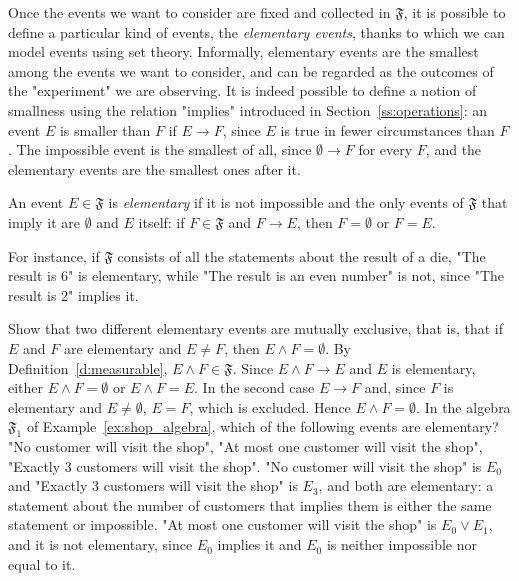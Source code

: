 Once the events we want to consider are fixed and collected in $\mathfrak F$, it is possible to define a particular kind of events, the \emph{elementary events}, thanks to which we can model events using set theory. Informally, elementary events are the smallest among the events we want to consider, and can be regarded as the outcomes of the "experiment" we are observing. It is indeed possible to define a notion of smallness using the relation "implies" introduced in Section~\ref{ss:operations}: an event $E$ is smaller than $F$ if $E \rightarrow F$, since $E$ is true in fewer circumstances than $F$. The impossible event is the smallest of all, since $\emptyset \rightarrow F$ for every $F$, and the elementary events are the smallest ones after it. 
\begin{definition}
	\label{d:elementary}
	An event $E \in \mathfrak F$ is \emph{elementary} if it is not impossible and the only events of $\mathfrak F$ that imply it are $\emptyset$ and $E$ itself: if $F \in \mathfrak F$ and $F \rightarrow E$, then $F = \emptyset$ or $F = E$. 
\end{definition}
For instance, if $\mathfrak F$ consists of all the statements about the result of a die, "The result is 6" is elementary, while "The result is an even number" is not, since "The result is 2" implies it. 
\begin{ExerciseList}
	\Exercise Show that two different elementary events are mutually exclusive, that is, that if $E$ and $F$ are elementary and $E \neq F$, then $E \wedge F = \emptyset$. 
	\Answer By Definition~\ref{d:measurable}, $E \wedge F \in \mathfrak F$. Since $E \wedge F \rightarrow E$ and $E$ is elementary, either $E \wedge F = \emptyset$ or $E \wedge F = E$. In the second case $E \rightarrow F$ and, since $F$ is elementary and $E \neq \emptyset$, $E = F$, which is excluded. Hence $E \wedge F = \emptyset$. 
	\Exercise In the algebra $\mathfrak F_1$ of Example~\ref{ex:shop_algebra}, which of the following events are elementary? "No customer will visit the shop", "At most one customer will visit the shop", "Exactly 3 customers will visit the shop". 
	\Answer "No customer will visit the shop" is $E_0$ and "Exactly 3 customers will visit the shop" is $E_3$, and both are elementary: a statement about the number of customers that implies them is either the same statement or impossible. "At most one customer will visit the shop" is $E_0 \vee E_1$, and it is not elementary, since $E_0$ implies it and $E_0$ is neither impossible nor equal to it.
\end{ExerciseList}

